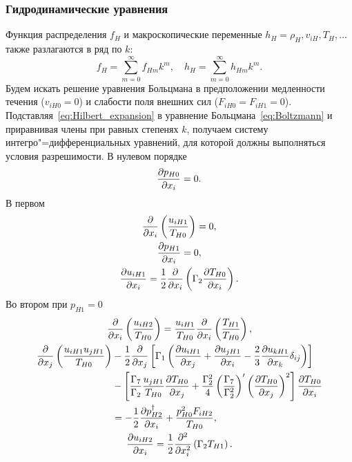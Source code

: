 \subsubsection{Гидродинамические уравнения}

Функция распределения \(f_H\) и макроскопические переменные \(h_H = \rho_H, v_{iH}, T_H, \dots\)
также разлагаются в ряд по \(k\):
\begin{equation}\label{eq:Hilbert_expansion}
    f_H = \sum_{m=0}^\infty f_{Hm} k^m, \quad h_H = \sum_{m=0}^\infty h_{Hm} k^m.
\end{equation}
Будем искать решение уравнения Больцмана в предположении
медленности течения (\(v_{iH0} = 0\)) и слабости поля внешних сил (\(F_{iH0} = F_{iH1} = 0\)).
Подставляя~\eqref{eq:Hilbert_expansion} в уравнение Больцмана~\eqref{eq:Boltzmann} и приравнивая члены
при равных степенях \(k\), получаем систему интегро"=дифференциальных уравнений,
для которой должны выполняться условия разрешимости. В нулевом порядке
\begin{equation}
    \pder[p_{H0}]{x_i} = 0. \label{eq:kgf:asymptotic0_p}
\end{equation}
В первом
\begin{gather}
    \pder{x_i}\left(\frac{u_{iH1}}{T_{H0}}\right) = 0, \label{eq:kgf:asymptotic1_u} \\
    \pder[p_{H1}]{x_i} = 0, \label{eq:kgf:asymptotic1_p} \\
    \pder[u_{iH1}]{x_i} = \frac12\pder{x_i}\left(\Gamma_2\pder[T_{H0}]{x_i}\right). \label{eq:kgf:asymptotic1_T}
\end{gather}
Во втором при \(p_{H1} = 0\)
\begin{gather}
    \pder{x_i}\left(\frac{u_{iH2}}{T_{H0}}\right)
        = \frac{u_{iH1}}{T_{H0}}\pder{x_i}\left(\frac{T_{H1}}{T_{H0}}\right), \label{eq:kgf:asymptotic2_u} \\
    \begin{aligned}
        \pder{x_j}\left(\frac{u_{iH1}u_{jH1}}{T_{H0}}\right)
        &-\frac12\pder{x_j}\left[\Gamma_1\left(
            \pder[u_{iH1}]{x_j} + \pder[u_{jH1}]{x_i} - \frac23\pder[u_{kH1}]{x_k}\delta_{ij}
        \right)\right] \\
        &-\left[
            \frac{\Gamma_7}{\Gamma_2}\frac{u_{jH1}}{T_{H0}}\pder[T_{H0}]{x_j}
            + \frac{\Gamma_2^2}4 \left(\frac{\Gamma_7}{\Gamma_2^2}\right)'
                \left(\pder[T_{H0}]{x_j}\right)^2
        \right]\pder[T_{H0}]{x_i} \\
        &= -\frac12\pder[p_{H2}^\dag]{x_i} + \frac{p_{H0}^2 F_{iH2}}{T_{H0}},
    \end{aligned} \label{eq:kgf:asymptotic2_p} \\
    \pder[u_{iH2}]{x_i} = \frac12\pderdual{x_i}\left(\Gamma_2T_{H1}\right). \label{eq:kgf:asymptotic2_T}
\end{gather}

